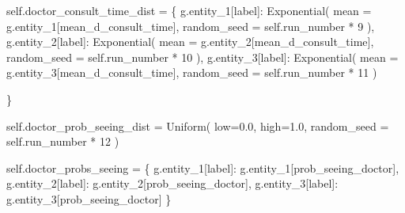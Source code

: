\documentclass[
  letterpaper,
  DIV=11,
  numbers=noendperiod]{scrreprt}
\newenvironment{Shaded}{}{}
\newcommand{\DecValTok}[1]{\textcolor[rgb]{0.00,0.36,0.77}{#1}}
\newcommand{\FloatTok}[1]{\textcolor[rgb]{0.00,0.36,0.77}{#1}}
\newcommand{\NormalTok}[1]{\textcolor[rgb]{0.14,0.16,0.18}{#1}}
\newcommand{\OperatorTok}[1]{\textcolor[rgb]{0.14,0.16,0.18}{#1}}
\newcommand{\StringTok}[1]{\textcolor[rgb]{0.01,0.18,0.38}{#1}}
\newcommand{\VariableTok}[1]{\textcolor[rgb]{0.89,0.38,0.04}{#1}}
\begin{document}
\begin{tcolorbox}
\begin{Shaded}
\begin{Highlighting}[]
        \VariableTok{self}\NormalTok{.doctor\_consult\_time\_dist }\OperatorTok{=}\NormalTok{ \{}
\NormalTok{            g.entity\_1[}\StringTok{\textquotesingle{}label\textquotesingle{}}\NormalTok{]: Exponential(}
\NormalTok{                mean }\OperatorTok{=}\NormalTok{ g.entity\_1[}\StringTok{\textquotesingle{}mean\_d\_consult\_time\textquotesingle{}}\NormalTok{],}
\NormalTok{                random\_seed }\OperatorTok{=} \VariableTok{self}\NormalTok{.run\_number }\OperatorTok{*} \DecValTok{9}
\NormalTok{                ),}
\NormalTok{            g.entity\_2[}\StringTok{\textquotesingle{}label\textquotesingle{}}\NormalTok{]: Exponential(}
\NormalTok{                mean }\OperatorTok{=}\NormalTok{ g.entity\_2[}\StringTok{\textquotesingle{}mean\_d\_consult\_time\textquotesingle{}}\NormalTok{],}
\NormalTok{                random\_seed }\OperatorTok{=} \VariableTok{self}\NormalTok{.run\_number }\OperatorTok{*} \DecValTok{10}
\NormalTok{                ),}
\NormalTok{            g.entity\_3[}\StringTok{\textquotesingle{}label\textquotesingle{}}\NormalTok{]: Exponential(}
\NormalTok{                mean }\OperatorTok{=}\NormalTok{ g.entity\_3[}\StringTok{\textquotesingle{}mean\_d\_consult\_time\textquotesingle{}}\NormalTok{],}
\NormalTok{                random\_seed }\OperatorTok{=} \VariableTok{self}\NormalTok{.run\_number }\OperatorTok{*} \DecValTok{11}
\NormalTok{                )}

\NormalTok{        \}}

        \VariableTok{self}\NormalTok{.doctor\_prob\_seeing\_dist }\OperatorTok{=}\NormalTok{ Uniform(}
\NormalTok{            low}\OperatorTok{=}\FloatTok{0.0}\NormalTok{,}
\NormalTok{            high}\OperatorTok{=}\FloatTok{1.0}\NormalTok{,}
\NormalTok{            random\_seed }\OperatorTok{=} \VariableTok{self}\NormalTok{.run\_number }\OperatorTok{*} \DecValTok{12}
\NormalTok{            )}

        \VariableTok{self}\NormalTok{.doctor\_probs\_seeing }\OperatorTok{=}\NormalTok{ \{}
\NormalTok{            g.entity\_1[}\StringTok{\textquotesingle{}label\textquotesingle{}}\NormalTok{]: g.entity\_1[}\StringTok{\textquotesingle{}prob\_seeing\_doctor\textquotesingle{}}\NormalTok{],}
\NormalTok{            g.entity\_2[}\StringTok{\textquotesingle{}label\textquotesingle{}}\NormalTok{]: g.entity\_2[}\StringTok{\textquotesingle{}prob\_seeing\_doctor\textquotesingle{}}\NormalTok{],}
\NormalTok{            g.entity\_3[}\StringTok{\textquotesingle{}label\textquotesingle{}}\NormalTok{]: g.entity\_3[}\StringTok{\textquotesingle{}prob\_seeing\_doctor\textquotesingle{}}\NormalTok{]}
\NormalTok{        \}}


\end{Highlighting}
\end{Shaded}
\end{tcolorbox}
\end{document}
